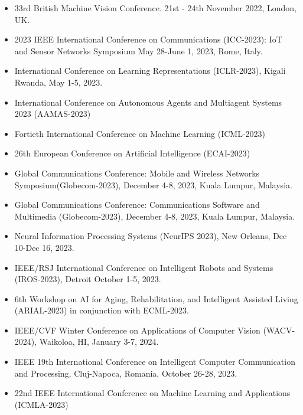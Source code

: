 \begin{itemize}
\item 33rd British Machine Vision Conference. 21st - 24th November 2022, London, UK.

\item 2023 IEEE International Conference on Communications (ICC-2023): IoT and Sensor Networks Symposium May 28-June 1, 2023, Rome, Italy.

\item International Conference on Learning Representations (ICLR-2023), Kigali Rwanda, May 1-5, 2023.


\item International Conference on Autonomous Agents and Multiagent Systems 2023 (AAMAS-2023)

\item Fortieth International Conference on Machine Learning (ICML-2023)

\item 26th European Conference on Artificial Intelligence (ECAI-2023)

\item Global Communications Conference: Mobile and Wireless Networks Symposium(Globecom-2023), December 4-8, 2023, Kuala Lumpur, Malaysia.

\item Global Communications Conference: Communications Software and Multimedia (Globecom-2023), December 4-8, 2023, Kuala Lumpur, Malaysia.


\item Neural Information Processing Systems (NeurIPS 2023), New Orleans, Dec 10-Dec 16, 2023.

\item IEEE/RSJ International Conference on Intelligent Robots and Systems (IROS-2023), Detroit October 1-5, 2023. 

\item 6th Workshop on AI for Aging, Rehabilitation, and Intelligent Assisted Living (ARIAL-2023) in conjunction with ECML-2023.

\item IEEE/CVF Winter Conference on Applications of Computer Vision (WACV-2024), Waikoloa, HI, January 3-7, 2024.

\item IEEE 19th International Conference on Intelligent Computer Communication and Processing, Cluj-Napoca, Romania, October 26-28, 2023.

\item 22nd IEEE International Conference on Machine Learning and Applications (ICMLA-2023)


\end{itemize}
